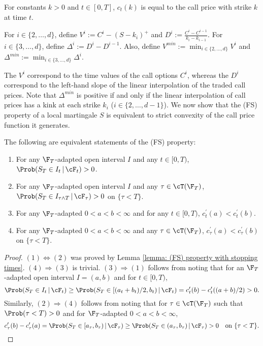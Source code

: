\documentclass[11pt]{article}
\begin{document}
For constants $k > 0$ and $t \in [0,T]$, $c_t(k)$ is equal to the call price with strike $k$ at time $t$.

\begin{definition}
\label{definition: time value and discretised slope}
For $i \in \{ 2, \ldots,d \}$, define $V^i := C^i - (S - k_i)^+$ and  $D^i := \frac{C^{i} - C^{i-1}}{k_i - k_{i-1}}$.  For $i \in \{ 3, \ldots,d \}$, define $\Delta^i := D^i - D^{i-1}$. Also, define $V^{min} := \min_{i \in \{2,\ldots,d\}} V^i$ and $\Delta^{min} := \min_{i \in \{3,\ldots,d\}} \Delta^i$. 
\end{definition}

The $V^i$ correspond to the time values of the call options $C^i$, whereas the $D^i$ correspond to the left-hand slope of the linear interpolation of the traded call prices. Note that $\Delta^{min}$ is positive if and only if the linear interpolation of call prices has a kink at each strike $k_i$ ($i \in \{2, \ldots, d-1 \}$). We now show that the (FS) property of a local martingale $S$ is equivalent to strict convexity of the call price function it generates.

\begin{lemma}
\label{lemma: equivalence between (FS) and strict convexity}
The following are equivalent statements of the (FS) property:
\begin{enumerate}
\item For any $\F_T$-adapted open interval $I$ and any $t \in [0,T)$, $
\Prob( S_T \in I_t \, | \, \cF_t) > 0$.
\item For any $\F_T$-adapted open interval $I$ and any $\tau \in \cT(\F_T)$, $\Prob( S_T \in I_{\tau \wedge T} \, | \, \cF_\tau) > 0$ on $\{ \tau < T \}$.
\item For any $\F_T$-adapted $0 < a < b < \infty$ and for any $t \in [0,T)$, $
c^\prime_t(a) < c^\prime_t(b)$.
\item For any $\F_T$-adapted $0 < a < b < \infty$ and any $\tau \in \cT(\F_T)$, $c^\prime_\tau(a) < c^\prime_\tau(b)$ on $\{\tau < T\}$.
\end{enumerate}
\end{lemma}

\begin{proof}

$(1) \Leftrightarrow (2)$ was proved by Lemma \ref{lemma: (FS) property with stopping times}. $(4) \Rightarrow (3)$ is trivial. $(3) \Rightarrow (1)$ follows from noting that for an $\F_T$-adapted open interval $I = (a,b)$ and for $t \in [0,T)$,
$$
\Prob( S_T \in I_t \, | \, \cF_t) \geq \Prob( S_T \in [(a_t + b_t)/2, b_t) \, | \, \cF_t ) = c^\prime_t(b) - c^\prime_t( (a+b)/2 ) > 0.
$$
Similarly, $(2) \Rightarrow (4)$ follows from noting that for $\tau \in \cT(\F_T)$ such that $\Prob(\tau < T) > 0$ and for $\F_T$-adapted $0 < a < b < \infty$,
$$
c^\prime_\tau(b) - c^\prime_\tau(a) = \Prob( S_T \in [a_\tau, b_\tau) \, | \, \cF_\tau) \geq \Prob( S_T \in (a_\tau, b_\tau) \, | \, \cF_\tau) > 0 \quad \textrm{on} \ \{\tau < T\}.
$$
\end{proof}
\end{document}
